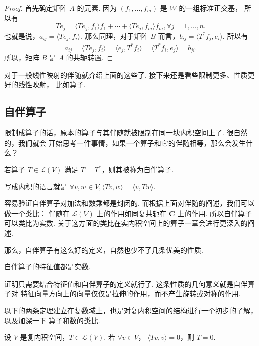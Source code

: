 \begin{proof}
    首先确定矩阵 $ A $ 的元素. 因为 $ (f_1, \ldots , f_m) $ 是 $ W $ 的一组标准正交基，
    所以有 
    \[ 
    Te_j = \langle Te_j, f_1 \rangle f_1 + \cdots + \langle Te_j, f_m \rangle f_m, \forall j = 1, \ldots , n.  
    \]
    也就是说，$ a_{ij} = \langle Te_j, f_i \rangle $. 
    那么同理，对于矩阵 $ B $ 而言，$ b_{ij} = \langle T^*f_j, e_i \rangle $. 
    所以有 
    \[ 
        a_{ij} = \langle Te_j, f_i \rangle = \langle e_j, T^*f_i \rangle
        = \overline{\langle T^*f_i, e_j \rangle} = \overline{b_{ji}}.
    \]
    所以，矩阵 $ B $ 是 $ A $ 的共轭转置. 
\end{proof}

对于一般线性映射的伴随就介绍上面的这些了. 接下来还是看些限制更多、性质更好的线性映射，
比如算子. 

\subsection{自伴算子}

限制成算子的话，原本的算子与其伴随就被限制在同一块内积空间上了. 很自然的，我们就会
开始思考一件事情，如果一个算子和它的伴随相等，那么会发生什么？

\begin{definition} 
    若算子 $ T \in \mathcal{L}(V) $ 满足 $ T = T^* $，则其被称为自伴算子.  
\end{definition}

写成内积的语言就是 $ \forall v, w \in V, \langle Tv, w \rangle = \langle v, Tw \rangle $.  

容易验证自伴算子对加法和数乘都是封闭的. 而根据上面对伴随的阐述，我们可以做一个类比：
伴随在 $ \mathcal{L}(V) $ 上的作用如同复共轭在 $ \mathbf{C} $ 上的作用. 所以自伴算子
可以类比为实数. 关于这方面的类比在实内积空间上的算子一章会进行更深入的阐述. 

那么，自伴算子有这么好的定义，自然也少不了几条优美的性质. 

\begin{theorem}
    自伴算子的特征值都是实数. 
\end{theorem}

证明只需要结合特征值和自伴算子的定义就行了. 这条性质的几何意义就是自伴算子对
特征向量方向上的向量仅仅是拉伸的作用，而不产生旋转或对称的作用. 

以下的两条定理建立在复数域上，也是对复内积空间的结构进行一个初步的了解，以及加深一下
算子和数的类比. 

\begin{theorem}
    设 $ V $ 是复内积空间，$ T \in \mathcal{L}(V) $. 若 $ \forall v \in V $，
    $ \langle Tv, v \rangle = 0 $，则 $ T = 0 $. 
\end{theorem}

